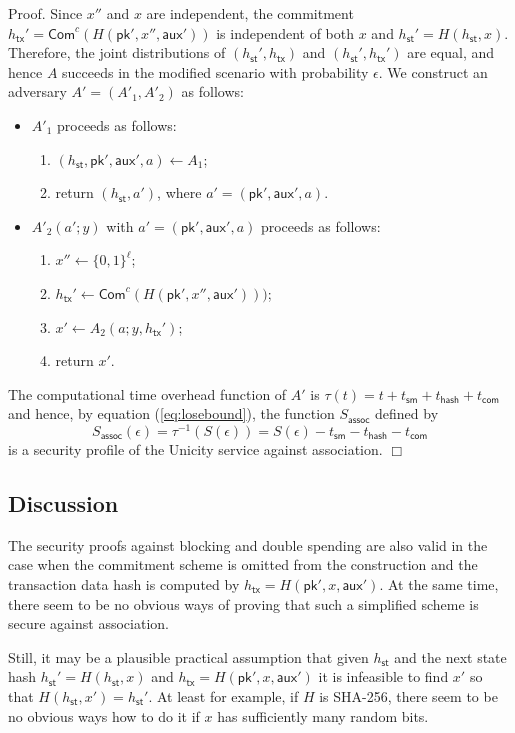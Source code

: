 \documentclass{article}
\newenvironment{proof}{\textsf{Proof}.}{\hfill$\Box$}
\newcommand{\pubkey}[0]{\mathsf{pk}}
\newcommand{\commitc}[0]{\mathsf{Com}^{c}}
\newcommand{\sthash}[0]{h_\mathsf{st}}
\newcommand{\txhash}[0]{h_\mathsf{tx}}
\newcommand{\auxd}[0]{\mathsf{aux}}
\begin{document}
\begin{proof}
Since $x''$ and $x$ are independent, the commitment $\txhash'=\commitc(H(\pubkey',x'',\auxd'))$ is independent of both $x$ and $\sthash'=H(\sthash,x)$. Therefore, the joint distributions of $(\sthash',\txhash)$ and $(\sthash',\txhash')$ are equal, and hence $A$ succeeds in the modified scenario with probability $\epsilon$. We construct an adversary $A'=(A'_1,A'_2)$ as follows:
\begin{itemize}
\item $A'_1$ proceeds as follows:
\begin{enumerate}
\item $(\sthash, \pubkey', \auxd', a)\gets A_1$;
\item return $(\sthash, a')$, where $a'=(\pubkey', \auxd', a)$.
\end{enumerate}
\item $A'_2(a';y)$ with $a'=(\pubkey', \auxd', a)$ proceeds as follows:
\begin{enumerate}
\item $x''\gets \{0,1\}^\ell$;
\item $\txhash'\gets\commitc(H(\pubkey',x'',\auxd')))$;
\item $x'\gets A_2(a; y,\txhash')$;
\item return $x'$.
\end{enumerate}
\end{itemize}

\noindent The computational time overhead function of $A'$ is $\tau(t) = t + t_\mathsf{sm} + t_\mathsf{hash} + t_\mathsf{com}$ and hence, by equation (\ref{eq:losebound}), the function $S_\mathsf{assoc}$ defined by
\[
S_\mathsf{assoc}(\epsilon) = \tau^{-1}(S(\epsilon)) = S(\epsilon) - t_\mathsf{sm} - t_\mathsf{hash} - t_\mathsf{com}
\]
is a security profile of the Unicity service against association.
\end{proof}

\subsection{Discussion}

The security proofs against blocking and double spending are also valid in the case when the commitment scheme is omitted from the construction and the transaction data hash is computed by $\txhash = H(\pubkey',x,\auxd')$.
At the same time, there seem to be no obvious ways of proving that such a simplified scheme is secure against association.

Still, it may be a plausible practical assumption that given $\sthash$ and the next state hash $\sthash'=H(\sthash,x)$ and $\txhash = H(\pubkey',x,\auxd')$ it is infeasible to find $x'$ so that $H(\sthash,x')=\sthash'$. At least for example, if $H$ is \textsf{SHA-256}, there seem to be no obvious ways how to do it if $x$ has sufficiently many random bits.
\end{document}
